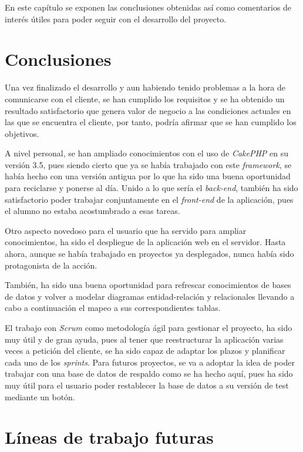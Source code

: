 
En este capítulo se exponen las conclusiones obtenidas así como comentarios de interés útiles para poder seguir con el desarrollo del proyecto.

\section{Conclusiones}

Una vez finalizado el desarrollo y aun habiendo tenido problemas a la hora de comunicarse con el cliente, se han cumplido los requisitos y se ha obtenido un resultado satisfactorio que genera valor de negocio a las condiciones actuales en las que se encuentra el cliente, por tanto, podría afirmar que se han cumplido los objetivos.

A nivel personal, se han ampliado conocimientos con el uso de \textit{CakePHP} en su versión 3.5, pues siendo cierto que ya se había trabajado con este \textit{framework}, se había hecho con una versión antigua por lo que ha sido una buena oportunidad para reciclarse y ponerse al día. Unido a lo que sería el \textit{back-end}, también ha sido satisfactorio poder trabajar conjuntamente en el \textit{front-end} de la aplicación, pues el alumno no estaba acostumbrado a esas tareas.

Otro aspecto novedoso para el usuario que ha servido para ampliar conocimientos, ha sido el despliegue de la aplicación web en el servidor. Hasta ahora, aunque se había trabajado en proyectos ya desplegados, nunca había sido protagonista de la acción.

También, ha sido una buena oportunidad para refrescar conocimientos de bases de datos y volver a modelar diagramas entidad-relación y relacionales llevando a cabo a continuación el mapeo a sus correspondientes tablas. 

El trabajo con \textit{Scrum} como metodología ágil para gestionar el proyecto, ha sido muy útil y de gran ayuda, pues al tener que reestructurar la aplicación varias veces a petición del cliente, se ha sido capaz de adaptar los plazos y planificar cada uno de los \textit{sprints}. Para futuros proyectos, se va a adoptar la idea de poder trabajar con una base de datos de respaldo como se ha hecho aquí, pues ha sido muy útil para el usuario poder restablecer la base de datos a su versión de test mediante un botón.

\section{Líneas de trabajo futuras}

